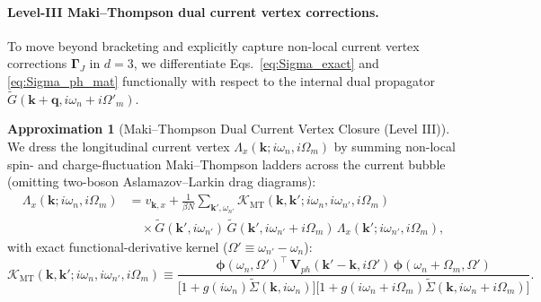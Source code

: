\documentclass[11pt,a4paper]{article}
\numberwithin{equation}{section}
\theoremstyle{plain}
\theoremstyle{definition}
\newtheorem{approximation}{Approximation}[section]
\providecommand{\vk}{\mathbf{k}}
\providecommand{\vq}{\mathbf{q}}
\begin{document}
\paragraph{Level-III Maki--Thompson dual current vertex corrections.}
To move beyond bracketing and explicitly capture non-local current vertex corrections
$\mathbf{\Gamma}_J$ in $d = 3$, we differentiate Eqs.~\eqref{eq:Sigma_exact} and
\eqref{eq:Sigma_ph_mat} functionally with respect to the internal dual propagator
$\tilde{G}(\vk+\vq, i\omega_n+i\Omega'_m)$.

\begin{approximation}[Maki--Thompson Dual Current Vertex Closure (Level III)]
We dress the longitudinal current vertex $\Lambda_x(\vk; i\omega_n, i\Omega_m)$ by
summing non-local spin- and charge-fluctuation Maki--Thompson ladders across the
current bubble (omitting two-boson Aslamazov--Larkin drag diagrams):
\begin{equation}
\begin{split}
    \Lambda_x(\vk; i\omega_n, i\Omega_m)
    &= v_{\vk, x}
       + \frac{1}{\beta N} \sum_{\vk',\omega_{n'}}
         \mathcal{K}_{\mathrm{MT}}(\vk,\vk'; i\omega_n, i\omega_{n'}, i\Omega_m) \\
    &\quad \times \tilde{G}(\vk', i\omega_{n'})\,
                  \tilde{G}(\vk', i\omega_{n'} + i\Omega_m)\,
                  \Lambda_x(\vk'; i\omega_{n'}, i\Omega_m),
\end{split}
\label{eq:MT_vertex}
\end{equation}
with exact functional-derivative kernel ($\Omega' \equiv \omega_{n'} - \omega_n$):
\begin{equation}
    \mathcal{K}_{\mathrm{MT}}(\vk,\vk'; i\omega_n, i\omega_{n'}, i\Omega_m)
    \equiv \frac{\boldsymbol{\phi}(\omega_n, \Omega')^\top\,
                 \mathbf{V}_{ph}(\vk' - \vk, i\Omega')\,
                 \boldsymbol{\phi}(\omega_n+\Omega_m, \Omega')}
                {\bigl[1 + g(i\omega_n)\tilde{\Sigma}(\vk,i\omega_n)\bigr]
                 \bigl[1 + g(i\omega_n+i\Omega_m)\tilde{\Sigma}(\vk,i\omega_n+i\Omega_m)\bigr]}.
    \label{eq:K_MT}
\end{equation}
\end{approximation}
\end{document}
